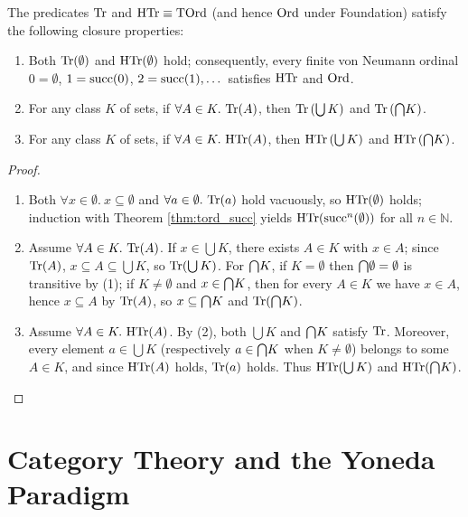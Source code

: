 \documentclass[10pt,a4paper]{article}
\renewcommand{\myprf}{\begin{proof}}
\renewcommand{\myqed}{\end{proof}}
\begin{document}
\begin{theorem}\label{thm:tord_closure}
The predicates ${\textrm{Tr}}$ and ${\textrm{HTr}} \equiv {\textrm{TOrd}}$ (and hence ${\textrm{Ord}}$ under Foundation) satisfy the following closure properties:
\begin{enumerate}
\item Both ${\textrm{Tr}}(\emptyset)$ and ${\textrm{HTr}}(\emptyset)$ hold; consequently, every finite von Neumann ordinal $0 = \emptyset$, $1 = {\textrm{succ}}(0)$, $2 = {\textrm{succ}}(1), \dots$ satisfies ${\textrm{HTr}}$ and ${\textrm{Ord}}$.
\item For any class $K$ of sets, if $\forall A \in K.\ \Tr(A)$, then ${\textrm{Tr}}\left(\bigcup K\right)$ and ${\textrm{Tr}}\left({\bigcap} K\right)$.
\item For any class $K$ of sets, if $\forall A \in K.\ \HTr(A)$, then ${\textrm{HTr}}\left(\bigcup K\right)$ and ${\textrm{HTr}}\left({\bigcap} K\right)$.
\end{enumerate}
\end{theorem}
\myprf
\begin{enumerate}
\item Both $\forall x \in \emptyset.\ x \subseteq \emptyset$ and $\forall a \in \emptyset.\ {\textrm{Tr}}(a)$ hold vacuously, so ${\textrm{HTr}}(\emptyset)$ holds; induction with Theorem \ref{thm:tord_succ} yields ${\textrm{HTr}}({\textrm{succ}}^n(\emptyset))$ for all $n \in \mathbb{N}$.
\item Assume $\forall A \in K.\ \Tr(A)$. If $x \in \bigcup K$, there exists $A \in K$ with $x \in A$; since ${\textrm{Tr}}(A)$, $x \subseteq A \subseteq \bigcup K$, so ${\textrm{Tr}}(\bigcup K)$. For ${\bigcap} K$, if $K = \emptyset$ then ${\bigcap} \emptyset = \emptyset$ is transitive by (1); if $K \neq \emptyset$ and $x \in {\bigcap} K$, then for every $A \in K$ we have $x \in A$, hence $x \subseteq A$ by ${\textrm{Tr}}(A)$, so $x \subseteq {\bigcap} K$ and ${\textrm{Tr}}({\bigcap} K)$.
\item Assume $\forall A \in K.\ \HTr(A)$. By (2), both $\bigcup K$ and ${\bigcap} K$ satisfy ${\textrm{Tr}}$. Moreover, every element $a \in \bigcup K$ (respectively $a \in {\bigcap} K$ when $K \neq \emptyset$) belongs to some $A \in K$, and since ${\textrm{HTr}}(A)$ holds, ${\textrm{Tr}}(a)$ holds. Thus ${\textrm{HTr}}(\bigcup K)$ and ${\textrm{HTr}}({\bigcap} K)$.
\end{enumerate}
\myqed

\part{Category Theory and the Yoneda Paradigm}\label{part:category}
\end{document}
